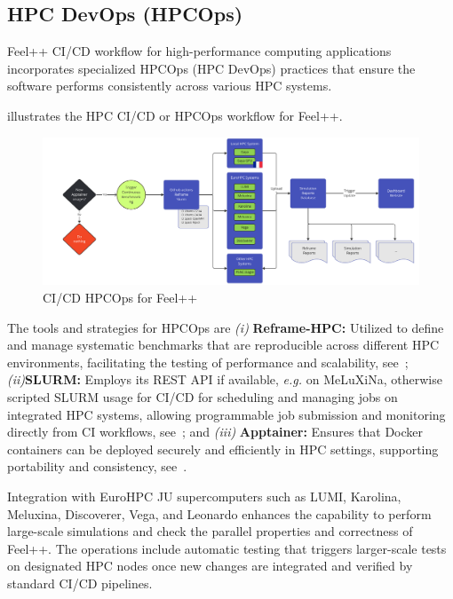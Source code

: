 \documentclass[runningheads]{llncs}
\begin{document}
\subsection{HPC DevOps (HPCOps)}
Feel++ CI/CD workflow for high-performance computing applications incorporates specialized HPCOps (HPC DevOps) practices that ensure the software performs consistently across various HPC systems.


 illustrates the HPC CI/CD or HPCOps workflow for Feel++.
\begin{figure}
    \centering
    \includegraphics[width=\textwidth]{img-feelpp-hpcops.pdf}
    \caption{CI/CD HPCOps for Feel++}
    \label{fig:feelpp-hpcops}
\end{figure}

The tools and strategies for HPCOps are  \textit{(i) }\textbf{Reframe-HPC:} Utilized to define and manage systematic benchmarks that are reproducible across different HPC environments, facilitating the testing of performance and scalability, see~\cite{karakasis_reframe-hpcreframe_2024};
\textit{(ii)}\textbf{SLURM:} Employs its REST API if available, \textit{e.g.} on MeLuXiNa, otherwise scripted SLURM usage for CI/CD for scheduling and managing jobs on integrated HPC systems, allowing programmable job submission and monitoring directly from CI workflows, see~\cite{slurm_development_team_slurm_2024}; and \textit{(iii)} \textbf{Apptainer:} Ensures that Docker containers can be deployed securely and efficiently in HPC settings, supporting portability and consistency, see~\cite{apptainer_contributors_apptainer_2024}.

Integration with EuroHPC JU supercomputers such as LUMI, Karolina, Meluxina, Discoverer, Vega, and Leonardo enhances the capability to perform large-scale simulations and check the parallel properties and correctness of Feel++. 
The operations include automatic testing that triggers larger-scale tests on designated HPC nodes once new changes are integrated and verified by standard CI/CD pipelines.
\end{document}
